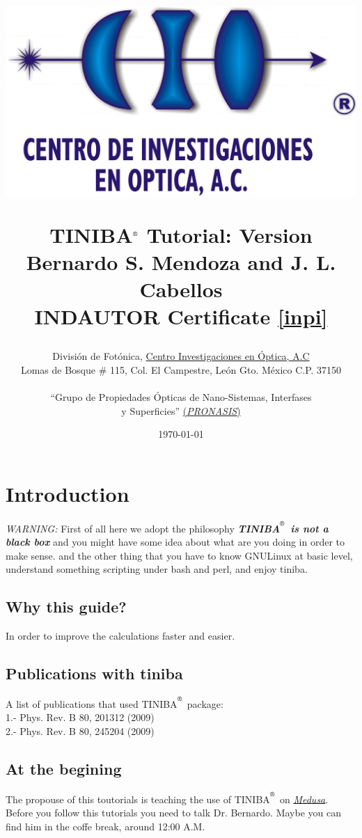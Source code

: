 \documentclass[openany,oneside]{book}
\title{
\vspace{-50pt}
\begin{center}
\includegraphics[scale=0.5]{logo-cio-nuevo.jpg}  
\vspace{10pt}
\end{center}
\vspace{12pt}
\Large{\textbf{TINIBA$^{\reg}$ Tutorial: Version \ver} \\
 Bernardo S. Mendoza and J. L. Cabellos}\\
INDAUTOR Certificate \ref{inpi} 
}
\author{{Divisi\'on de Fot\'onica, \href{http://www.cio.mx}{Centro
      Investigaciones en \'Optica, A.C }}\\
\small{Lomas de Bosque \# 115, Col. El Campestre, Le\'on Gto. M\'exico C.P. 37150}\\ 
\date{\today }
``Grupo de Propiedades \'Opticas de Nano-Sistemas, Interfases\\ y 
Superficies''
\href{http://aida.cio.mx}{(\emph{PRONASIS})} \\   
}
\def\reg{\textsuperscript{\textregistered}}
\numberwithin{equation}{section}
\begin{document}
\maketitle
\tableofcontents


\newpage
\chapter{Introduction}

\emph{WARNING:}
First of all here we adopt the philosophy \emph{{\bf{TINIBA$^\reg$ is
      not a black box}}} 
and you might have some idea about what are you doing in order to make sense.
and the other thing that you have to know GNU\/Linux at basic level, 
understand something  scripting under bash and perl, 
and enjoy tiniba.   
  
\section{Why this guide?}
In order to improve the calculations faster and easier. 

\section{Publications with tiniba}
 A list of publications that used TINIBA$^\reg$ package:\\
 1.- Phys. Rev. B 80, 201312 (2009) \\  
 2.- Phys. Rev. B 80, 245204 (2009) \\ 

\section{At the begining}
The propouse of this toutorials is teaching the use of TINIBA$^\reg$ 
on \href{http://aida.cio.mx/medusaPhotos/medusaPhoto2.jpg} {\emph{Medusa}}.\\ 
Before you follow this tutorials you need to talk  Dr. Bernardo.  
Maybe you can find him in the coffe break, around 12:00 A.M.
\end{document}

